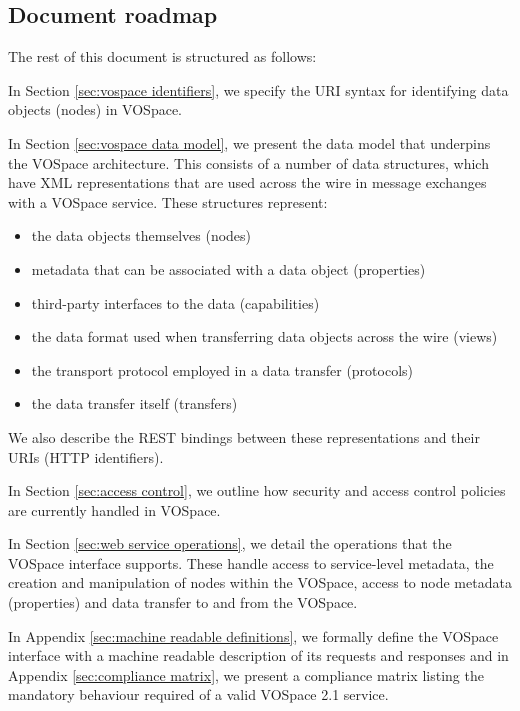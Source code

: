 \documentclass[11pt,a4paper]{ivoa}
\begin{document}
\subsection{Document roadmap}
\label{subsec:document roadmap}
The rest of this document is structured as follows:

In Section \ref{sec:vospace identifiers}, we specify the URI syntax for identifying data objects (nodes) in VOSpace.

In Section \ref{sec:vospace data model}, we present the data model that underpins the VOSpace architecture. This consists of a number of data structures, which have XML representations that are used across the wire in message exchanges with a VOSpace service. These structures represent:

\begin{itemize}
    \item the data objects themselves (nodes)
    \item metadata that can be associated with a data object (properties)
    \item third-party interfaces to the data (capabilities)
    \item the data format used when transferring data objects across the wire (views)
    \item the transport protocol employed in a data transfer (protocols)
    \item the data transfer itself (transfers)
\end{itemize}

We also describe the REST bindings between these representations and their URIs (HTTP identifiers).

In Section \ref{sec:access control}, we outline how security and access control policies are currently handled in VOSpace.

In Section \ref{sec:web service operations}, we detail the operations that the VOSpace interface supports. These handle access to service-level metadata, the creation and manipulation of nodes within the VOSpace, access to node metadata (properties) and data transfer to and from the VOSpace.

In Appendix \ref{sec:machine readable definitions}, we formally define the VOSpace interface with a machine readable description of its requests and responses and in Appendix \ref{sec:compliance matrix}, we present a compliance matrix listing the mandatory behaviour required of a valid VOSpace 2.1 service.
\end{document}
